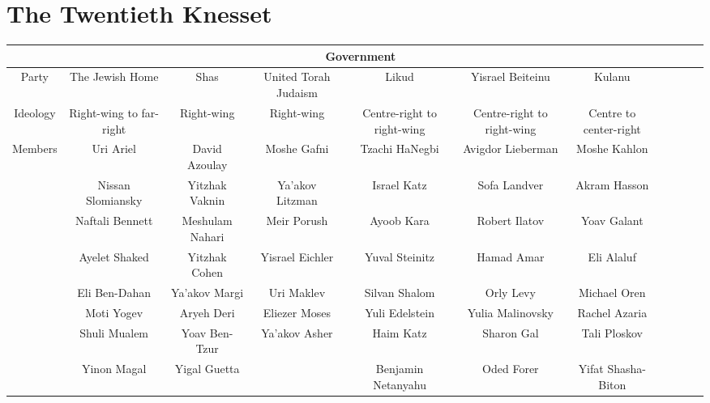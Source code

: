 \chapter{The Twentieth Knesset}
\label{append:the_20th_knesset}

\begin{landscape}
\begin{table}
\tiny
\centering
\begin{tabular}{|c|c|c|c|c|c|c|c|c|c|c|}
  \hline
                            & \multicolumn{6}{c|}{Government}                                                                                           \\
  \hline
Party                       & The Jewish Home   & Shas              & United Torah Judaism & Likud              & Yisrael Beiteinu  & Kulanu             \\
  \hline
Ideology              & Right-wing to far-right & Right-wing  & Right-wing           & Centre-right to right-wing & Centre-right to right-wing  & Centre to center-right \\
  \hline
\multirow{34}{*}{Members}   & Uri Ariel         & David Azoulay     & Moshe Gafni          & Tzachi HaNegbi     & Avigdor Lieberman & Moshe Kahlon       \\
                            & Nissan Slomiansky & Yitzhak Vaknin    & Ya'akov Litzman      & Israel Katz        & Sofa Landver      & Akram Hasson       \\
                            & Naftali Bennett   & Meshulam Nahari   & Meir Porush          & Ayoob Kara         & Robert Ilatov     & Yoav Galant        \\
                            & Ayelet Shaked     & Yitzhak Cohen     & Yisrael Eichler      & Yuval Steinitz     & Hamad Amar        & Eli Alaluf         \\
                            & Eli Ben-Dahan     & Ya'akov Margi     & Uri Maklev           & Silvan Shalom      & Orly Levy         & Michael Oren       \\
                            & Moti Yogev        & Aryeh Deri        & Eliezer Moses        & Yuli Edelstein     & Yulia Malinovsky  & Rachel Azaria      \\
                            & Shuli Mualem      & Yoav Ben-Tzur     & Ya'akov Asher        & Haim Katz          & Sharon Gal        & Tali Ploskov       \\
                            & Yinon Magal       & Yigal Guetta      &                      & Benjamin Netanyahu & Oded Forer        & Yifat Shasha-Biton \\

\end{tabular}
\end{table}
\end{landscape}
